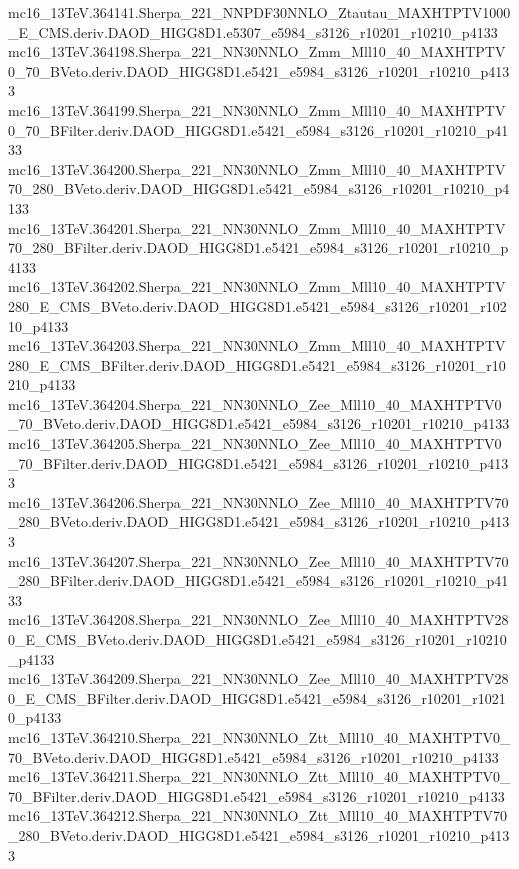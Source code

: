 mc16_13TeV.364141.Sherpa_221_NNPDF30NNLO_Ztautau_MAXHTPTV1000_E_CMS.deriv.DAOD_HIGG8D1.e5307_e5984_s3126_r10201_r10210_p4133 \\
mc16_13TeV.364198.Sherpa_221_NN30NNLO_Zmm_Mll10_40_MAXHTPTV0_70_BVeto.deriv.DAOD_HIGG8D1.e5421_e5984_s3126_r10201_r10210_p4133 \\
mc16_13TeV.364199.Sherpa_221_NN30NNLO_Zmm_Mll10_40_MAXHTPTV0_70_BFilter.deriv.DAOD_HIGG8D1.e5421_e5984_s3126_r10201_r10210_p4133 \\
mc16_13TeV.364200.Sherpa_221_NN30NNLO_Zmm_Mll10_40_MAXHTPTV70_280_BVeto.deriv.DAOD_HIGG8D1.e5421_e5984_s3126_r10201_r10210_p4133 \\
mc16_13TeV.364201.Sherpa_221_NN30NNLO_Zmm_Mll10_40_MAXHTPTV70_280_BFilter.deriv.DAOD_HIGG8D1.e5421_e5984_s3126_r10201_r10210_p4133 \\
mc16_13TeV.364202.Sherpa_221_NN30NNLO_Zmm_Mll10_40_MAXHTPTV280_E_CMS_BVeto.deriv.DAOD_HIGG8D1.e5421_e5984_s3126_r10201_r10210_p4133 \\
mc16_13TeV.364203.Sherpa_221_NN30NNLO_Zmm_Mll10_40_MAXHTPTV280_E_CMS_BFilter.deriv.DAOD_HIGG8D1.e5421_e5984_s3126_r10201_r10210_p4133 \\
mc16_13TeV.364204.Sherpa_221_NN30NNLO_Zee_Mll10_40_MAXHTPTV0_70_BVeto.deriv.DAOD_HIGG8D1.e5421_e5984_s3126_r10201_r10210_p4133 \\
mc16_13TeV.364205.Sherpa_221_NN30NNLO_Zee_Mll10_40_MAXHTPTV0_70_BFilter.deriv.DAOD_HIGG8D1.e5421_e5984_s3126_r10201_r10210_p4133 \\
mc16_13TeV.364206.Sherpa_221_NN30NNLO_Zee_Mll10_40_MAXHTPTV70_280_BVeto.deriv.DAOD_HIGG8D1.e5421_e5984_s3126_r10201_r10210_p4133 \\
mc16_13TeV.364207.Sherpa_221_NN30NNLO_Zee_Mll10_40_MAXHTPTV70_280_BFilter.deriv.DAOD_HIGG8D1.e5421_e5984_s3126_r10201_r10210_p4133 \\
mc16_13TeV.364208.Sherpa_221_NN30NNLO_Zee_Mll10_40_MAXHTPTV280_E_CMS_BVeto.deriv.DAOD_HIGG8D1.e5421_e5984_s3126_r10201_r10210_p4133 \\
mc16_13TeV.364209.Sherpa_221_NN30NNLO_Zee_Mll10_40_MAXHTPTV280_E_CMS_BFilter.deriv.DAOD_HIGG8D1.e5421_e5984_s3126_r10201_r10210_p4133 \\
mc16_13TeV.364210.Sherpa_221_NN30NNLO_Ztt_Mll10_40_MAXHTPTV0_70_BVeto.deriv.DAOD_HIGG8D1.e5421_e5984_s3126_r10201_r10210_p4133 \\
mc16_13TeV.364211.Sherpa_221_NN30NNLO_Ztt_Mll10_40_MAXHTPTV0_70_BFilter.deriv.DAOD_HIGG8D1.e5421_e5984_s3126_r10201_r10210_p4133 \\
mc16_13TeV.364212.Sherpa_221_NN30NNLO_Ztt_Mll10_40_MAXHTPTV70_280_BVeto.deriv.DAOD_HIGG8D1.e5421_e5984_s3126_r10201_r10210_p4133 \\

